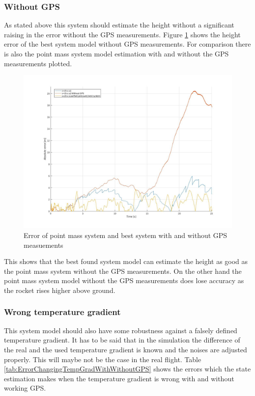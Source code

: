 \subsubsection{Without GPS}
As stated above this system should estimate the height without a significant raising in the error without the GPS measurements.
Figure \ref{fig:ErrorWitoutGPS} shows the height error of the best system model without GPS measurements.
For comparison there is also the point mass system model estimation with and without the GPS measurements plotted.

\begin{figure}[h!]
 \centering
 \includegraphics[width=.8\textwidth]{./Pictures/ErrorPointMassBestSystemWithoutGPS.jpg}
 \caption{Error of point mass system and best system with and without GPS measuements}
 \label{fig:ErrorWitoutGPS}
\end{figure}

This shows that the best found system model can estimate the height as good as the point mass system without the GPS measurements.
On the other hand the point mass system model without the GPS measurements does lose accuracy as the rocket rises higher above ground.

\subsubsection{Wrong temperature gradient}
This system model should also have some robustness against a falsely defined temperature gradient. 
It has to be said that in the simulation the difference of the real and the used temperature gradient is known and the noises are adjusted properly.
This will maybe not be the case in the real flight.
Table \ref{tab:ErrorChangingTempGradWithWithoutGPS} shows the errors which the state estimation makes when the temperature gradient is wrong with and without working GPS.

